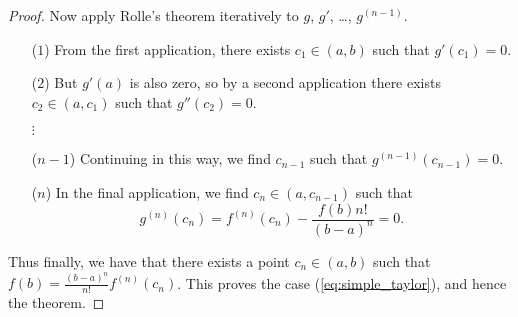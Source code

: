 \begin{proof}
    Now apply Rolle's theorem iteratively to $g$, $g'$, \dots, $g^{(n-1)}$.
    \begin{itemize}
        \item[($1$)] From the first application, there exists $c_1 \in (a, b)$
        such that $g'(c_1) = 0$.
        \item[($2$)] But $g'(a)$ is also zero, so by a second application
        there exists $c_2 \in (a, c_1)$ such that $g''(c_2) = 0$.
        \item[$\vdots$\hphantom{)}]
        \item[($n-1$)] Continuing in this way, we find $c_{n-1}$ such that
        $g^{(n-1)}(c_{n-1}) = 0$.
        \item[($n$)] In the final application, we find $c_n \in (a, c_{n-1})$
        such that \[
            g^{(n)}(c_n) = f^{(n)}(c_n) - \frac{f(b) n!}{(b - a)^n} = 0.
        \]
    \end{itemize}
    Thus finally, we have that there exists a point $c_n \in (a, b)$
    such that $f(b) = \frac{(b - a)^n}{n!} f^{(n)}(c_n)$.
    This proves the case (\ref{eq:simple_taylor}), and hence the theorem.
\end{proof}

